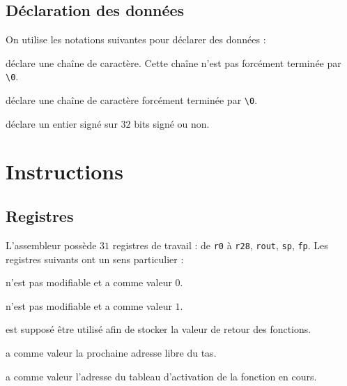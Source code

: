 \documentclass[french, 12pt]{article}
\begin{document}
\subsection*{Déclaration des données}

On utilise les notations suivantes pour déclarer des données :
\begin{description}[format=\normalfont, leftmargin=!, labelwidth=\widthof{\textbf{\texttt{.string}} \textit{text}}]
      \item[\textbf{\texttt{.ascii}} \textit{text}] déclare une chaîne de caractère.
            Cette chaîne n'est pas forcément terminée par \verb|\0|.
      \item[\textbf{\texttt{.string}} \textit{text}] déclare une chaîne de caractère forcément
            terminée par \verb|\0|.
      \item[\textbf{\texttt{.int}}] déclare un entier signé sur $32$ bits signé ou non.
\end{description}

\section*{Instructions}

\subsection*{Registres}

L'assembleur possède $31$ registres de travail : de \texttt{r0} à \texttt{r28},
\texttt{rout}, \texttt{sp}, \texttt{fp}. Les registres suivants ont un sens
particulier :

\begin{description}[leftmargin=!, labelwidth=\widthof{\bf \texttt{rout}}]
      \item[\texttt{r0}] n'est pas modifiable et a comme valeur $0$.
      \item[\texttt{r1}] n'est pas modifiable et a comme valeur $1$.
      \item[\texttt{rout}] est supposé être utilisé afin de stocker la valeur de retour des fonctions.
      \item[\texttt{sp}] a comme valeur la prochaine adresse libre du tas.
      \item[\texttt{fp}] a comme valeur l'adresse du tableau d'activation de la fonction en cours.
\end{description}

\end{document}
